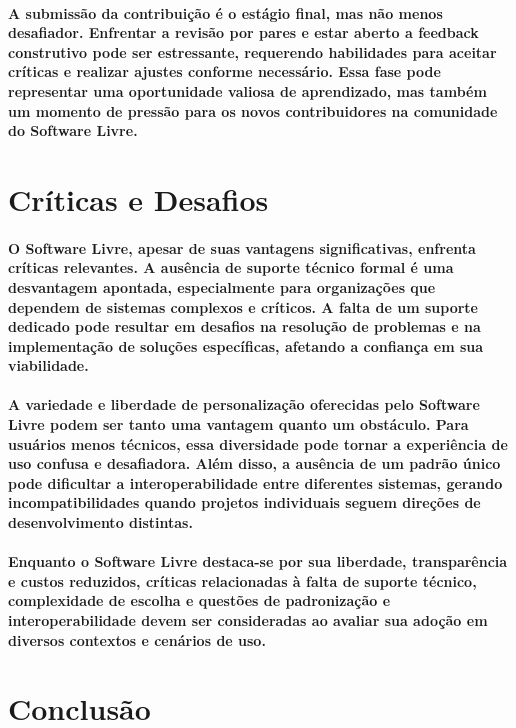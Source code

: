 \documentclass[a4paper, 12pt]{article}
\begin{document}
\paragraph{A submissão da contribuição é o estágio final, mas não menos desafiador. Enfrentar a revisão por pares e estar aberto a feedback construtivo pode ser estressante, requerendo habilidades para aceitar críticas e realizar ajustes conforme necessário. Essa fase pode representar uma oportunidade valiosa de aprendizado, mas também um momento de pressão para os novos contribuidores na comunidade do Software Livre.}

\section{Críticas e Desafios}
\paragraph{O Software Livre, apesar de suas vantagens significativas, enfrenta críticas relevantes. A ausência de suporte técnico formal é uma desvantagem apontada, especialmente para organizações que dependem de sistemas complexos e críticos. A falta de um suporte dedicado pode resultar em desafios na resolução de problemas e na implementação de soluções específicas, afetando a confiança em sua viabilidade.}
\paragraph{A variedade e liberdade de personalização oferecidas pelo Software Livre podem ser tanto uma vantagem quanto um obstáculo. Para usuários menos técnicos, essa diversidade pode tornar a experiência de uso confusa e desafiadora. Além disso, a ausência de um padrão único pode dificultar a interoperabilidade entre diferentes sistemas, gerando incompatibilidades quando projetos individuais seguem direções de desenvolvimento distintas.}
\paragraph{Enquanto o Software Livre destaca-se por sua liberdade, transparência e custos reduzidos, críticas relacionadas à falta de suporte técnico, complexidade de escolha e questões de padronização e interoperabilidade devem ser consideradas ao avaliar sua adoção em diversos contextos e cenários de uso.}

\section{Conclusão}
\end{document}
